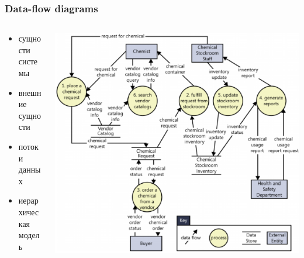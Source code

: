 \documentclass{../../slides-style}
\begin{document}
    \begin{frame}
        \frametitle{Data-flow diagrams}
        \begin{columns}
            \begin{column}{0.4\textwidth}
                \begin{itemize}
                    \item сущности системы
                    \item внешние сущности
                    \item потоки данных
                    \item иерархическая модель
                \end{itemize}
            \end{column}
            \begin{column}{0.6\textwidth}
                \strut
                \includegraphics[width=\textwidth]{dfd.png}
            \end{column}
        \end{columns}
    \end{frame}
\end{document}
